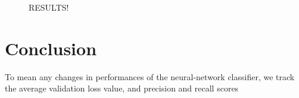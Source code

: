 \documentclass[12pt,letterpaper]{article}
\begin{document}

\begin{figure}[H]
\label{results}
RESULTS!
\end{figure}

\section*{Conclusion}To mean any changes in performances of the neural-network classifier, we track the average validation loss value, and precision and recall scores




\end{document}
